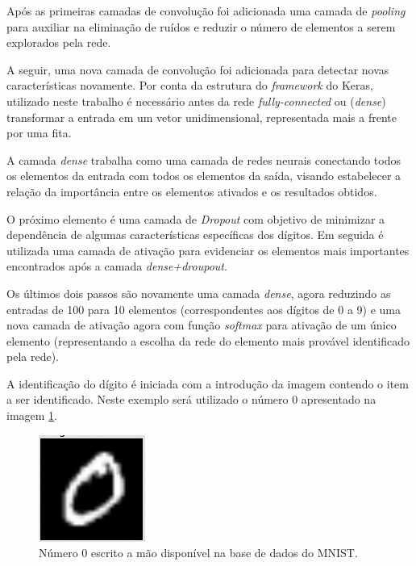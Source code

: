 \documentclass[
	12pt,				%
	oneside,			%
	a4paper,			%
	english,			%
	french,				%
	spanish,			%
	brazil,				%
	]{abntex2}
\begin{document}
\par Após as primeiras camadas de convolução foi adicionada uma camada de \textit{pooling} para auxiliar na eliminação de ruídos e reduzir o número de elementos a serem explorados pela rede.
\par A seguir, uma nova camada de convolução foi adicionada para detectar novas características novamente. Por conta da estrutura do \textit{framework} do Keras, utilizado neste trabalho é necessário antes da rede \textit{fully-connected} ou (\textit{dense}) transformar a entrada em um vetor unidimensional, representada mais a frente por uma fita.
\par A camada \textit{dense} trabalha como uma camada de redes neurais conectando todos os elementos da entrada com todos os elementos da saída, visando estabelecer a relação da importância entre os elementos ativados e os resultados obtidos.
\par O próximo elemento é uma camada de \textit{Dropout} com objetivo de minimizar a dependência de algumas características específicas dos dígitos. Em seguida é utilizada uma camada de ativação para evidenciar os elementos mais importantes encontrados após a camada \textit{dense+droupout}.
\par Os últimos dois passos são novamente uma camada \textit{dense}, agora reduzindo as entradas de 100 para 10 elementos  (correspondentes aos dígitos de 0 a 9) e uma nova camada de ativação agora com função \textit{softmax} para ativação de um único elemento (representando a escolha da rede do elemento mais provável identificado pela rede).

\par A identificação do dígito é iniciada com a introdução da imagem contendo o item a ser identificado. Neste exemplo será utilizado o número 0 apresentado na imagem \ref{fig:numero_0}.

\begin{center}
\begin{figure}[H]
	\centering
	\includegraphics[width=0.3\linewidth]{images/fabio/numero_0}
	\caption{Número 0 escrito a mão disponível na base de dados do MNIST.}
	\label{fig:numero_0}
\end{figure}
\end{center}
\end{document}
